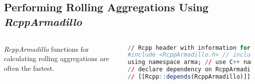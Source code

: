 \documentclass[10pt]{beamer}\usepackage[]{graphicx}\usepackage[]{color}
\begin{document}
\subsection{Performing Rolling Aggregations Using \protect\emph{RcppArmadillo}}
\begin{frame}[fragile,t]{\subsecname}
\vspace{-1em}
\begin{block}{}
  \begin{columns}[T]
      \emph{RcppArmadillo} functions for calculating rolling aggregations are often the fastest.
      \begin{lstlisting}[language=R,basicstyle=\tiny\ttfamily\bfseries,backgroundcolor=\color{anti_flashwhite},showstringspaces=FALSE]
// Rcpp header with information for C++ compiler
#include <RcppArmadillo.h> // include C++ header file from Armadillo library
using namespace arma; // use C++ namespace from Armadillo library
// declare dependency on RcppArmadillo
// [[Rcpp::depends(RcppArmadillo)]]


\end{lstlisting}
\end{columns}
\end{block}
\end{frame}
\end{document}
